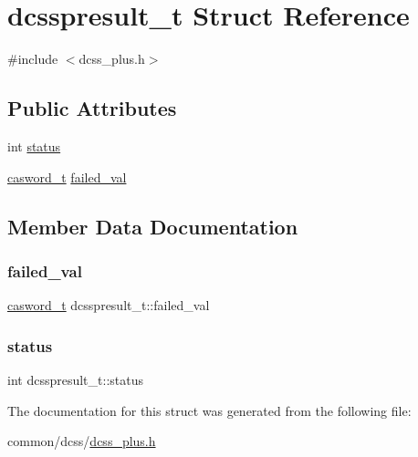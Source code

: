 \hypertarget{structdcsspresult__t}{}\section{dcsspresult\+\_\+t Struct Reference}
\label{structdcsspresult__t}


{\ttfamily \#include $<$dcss\+\_\+plus.\+h$>$}

\subsection*{Public Attributes}
\begin{DoxyCompactItemize}
\item 
int \hyperlink{structdcsspresult__t_acd4f9904b87b48a9b441af30c8144d6a}{status}
\item 
\hyperlink{rq__unsafe_8h_ad45142aaf2ff20a036dc6242b8483e9c}{casword\+\_\+t} \hyperlink{structdcsspresult__t_aca2c34b6dd9de97d82881b55a92147aa}{failed\+\_\+val}
\end{DoxyCompactItemize}


\subsection{Member Data Documentation}
\mbox{\label{structdcsspresult__t_aca2c34b6dd9de97d82881b55a92147aa}} 
\subsubsection{\texorpdfstring{failed\+\_\+val}{failed\_val}}
{\footnotesize\ttfamily \hyperlink{rq__unsafe_8h_ad45142aaf2ff20a036dc6242b8483e9c}{casword\+\_\+t} dcsspresult\+\_\+t\+::failed\+\_\+val}

\mbox{\label{structdcsspresult__t_acd4f9904b87b48a9b441af30c8144d6a}} 
\subsubsection{\texorpdfstring{status}{status}}
{\footnotesize\ttfamily int dcsspresult\+\_\+t\+::status}



The documentation for this struct was generated from the following file\+:\begin{DoxyCompactItemize}
\item 
common/dcss/\hyperlink{dcss__plus_8h}{dcss\+\_\+plus.\+h}\end{DoxyCompactItemize}
